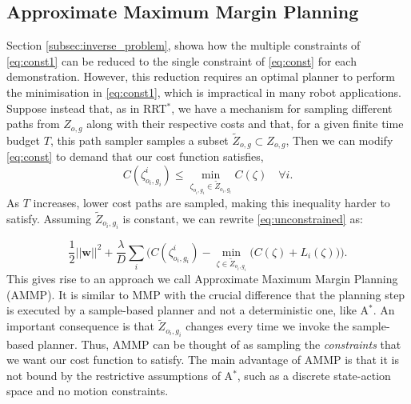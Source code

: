 \documentclass{article}  %
\begin{document}

	\subsection{Approximate Maximum Margin Planning \label{subsec:ammp}}

Section \ref{subsec:inverse_problem}, showa how the multiple constraints of \eqref{eq:const1} can be reduced to the single constraint of \eqref{eq:const} for each demonstration. However, this reduction requires an optimal planner to perform the minimisation in \eqref{eq:const1}, which is impractical in many robot applications.  Suppose instead that, as in RRT$^*$, we have a mechanism for sampling different paths from $Z_{o,g}$ along with their respective costs and that, for a given finite time budget $T$, this path sampler samples a subset $\tilde{Z}_{o,g} \subset Z_{o,g}$,  Then we can modify \eqref{eq:const} to demand that our cost function satisfies,
\begin{equation}
	C(\zeta^i_{o_i,g_i}) \leq \min_{\zeta_{o_i,g_i} \in \tilde{Z}_{o_i,g_i}} C(\zeta) \quad \forall i. \label{eq:const_rrt}
\end{equation}
	As $T$ increases, lower cost paths are sampled, making this inequality harder to satisfy. Assuming $\tilde{Z}_{o_i,g_i}$ is constant, we can rewrite \eqref{eq:unconstrained} as:

	\begin{equation} \frac{1}{2}||\mathbf{w}||^2 + \frac{\lambda}{D} \sum_i \big( C(\zeta^i_{o_i,g_i}) - \min_{\zeta \in \tilde{Z}_{o_i,g_i}}\big(C(\zeta) + L_i(\zeta)\big) \big). \label{eq:unconstrained_rrt}
	\end{equation}
This gives rise to an approach we call Approximate Maximum Margin Planning (AMMP). It is similar  to MMP with the crucial difference that the planning step is executed by a sample-based planner and not a deterministic one, like A$^*$. An important consequence is that $\tilde{Z}_{o_i,g_i}$ changes every time we invoke the sample-based planner. Thus, AMMP can be thought of as sampling the \emph{constraints} that we want our cost function to satisfy. The main advantage of AMMP is that it is not bound by the restrictive assumptions of  A$^*$, such as a discrete state-action space and no motion constraints. 
\end{document}
